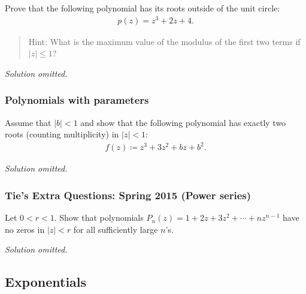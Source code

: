 \begin{problem}[?]

Prove that the following polynomial has its roots outside of the unit
circle:
\begin{align*}
p(z) = z^3 + 2z + 4
.\end{align*}

\begin{quote}
Hint: What is the maximum value of the modulus of the first two terms if
\({\left\lvert {z} \right\rvert} \leq 1\)?
\end{quote}

\end{problem}

\emph{Solution omitted.}

\hypertarget{polynomials-with-parameters}{%
\subsubsection{Polynomials with
parameters}\label{polynomials-with-parameters}}

\begin{problem}[?]

Assume that \({\left\lvert {b} \right\rvert} < 1\) and show that the
following polynomial has exactly two roots (counting multiplicity) in
\({\left\lvert {z} \right\rvert} < 1\):
\begin{align*}
f(z) \coloneqq z^3 + 3z^2 + bz + b^2
.\end{align*}

\end{problem}

\emph{Solution omitted.}

\hypertarget{ties-extra-questions-spring-2015-power-series}{%
\subsubsection{Tie's Extra Questions: Spring 2015 (Power
series)}\label{ties-extra-questions-spring-2015-power-series}}

\begin{problem}[?]

Let \(0<r<1\). Show that polynomials
\(P_n(z) = 1 + 2z + 3 z^2 + \cdots + n z^{n-1}\) have no zeros in
\(|z|<r\) for all sufficiently large \(n\)'s.

\end{problem}

\emph{Solution omitted.}

\hypertarget{exponentials}{%
\subsection{Exponentials}\label{exponentials}}

